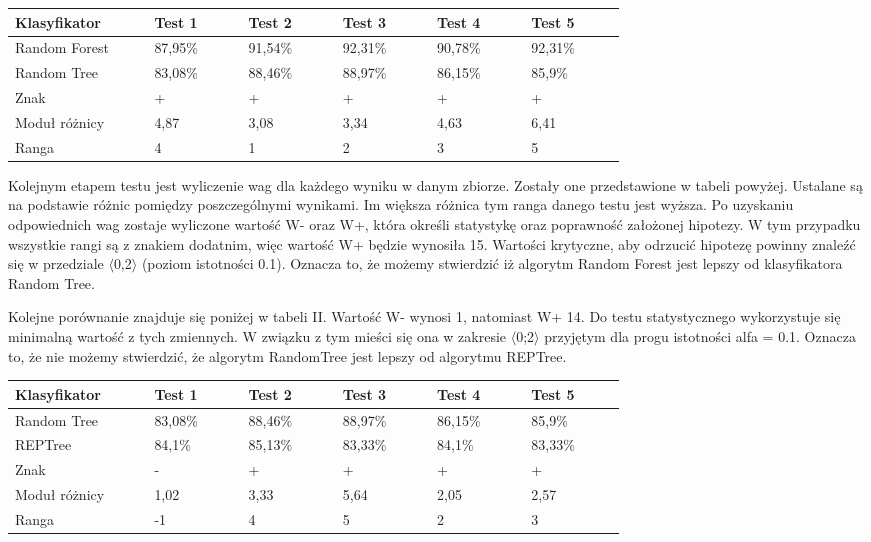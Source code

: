 \documentclass[conference]{IEEEtran}
\begin{document}
\begin{table}[H]

	\begin{tabular}{|p{0.16\linewidth}|p{0.11\linewidth}|p{0.11\linewidth}|p{0.11\linewidth}|p{0.11\linewidth}|p{0.11\linewidth}|}%
	\hline\centering
	Klasyfikator 	& Test 1 & Test 2 & Test 3 & Test 4 & Test 5 \\ \hline\centering
	Random Forest	& 87,95\% & 91,54\% & 92,31\% & 90,78\% & 92,31\% \\ \hline\centering
	Random Tree	& 83,08\% & 88,46\% & 88,97\% & 86,15\% & 85,9\% \\ \hline\centering
	Znak	& + & + & + & + & + \\ \hline\centering
	Moduł różnicy	& 4,87 & 3,08 & 3,34 & 4,63 & 6,41 \\ \hline\centering
	Ranga	& 4 & 1 & 2 & 3 & 5 \\ \hline
	\end{tabular}
\end{table}
Kolejnym etapem testu jest wyliczenie wag dla każdego wyniku w danym zbiorze. Zostały one przedstawione w tabeli powyżej. Ustalane są na podstawie różnic pomiędzy poszczególnymi wynikami. Im większa różnica tym ranga danego testu jest wyższa. Po uzyskaniu odpowiednich wag zostaje wyliczone wartość W- oraz W+, która określi statystykę oraz poprawność założonej hipotezy. W tym przypadku wszystkie rangi są z znakiem dodatnim, więc wartość W+ będzie wynosiła 15. Wartości krytyczne, aby odrzucić hipotezę powinny znaleźć się w przedziale $\langle$0,2$\rangle$ (poziom istotności 0.1). Oznacza to, że możemy stwierdzić iż algorytm Random Forest jest lepszy od klasyfikatora Random Tree. 

Kolejne porównanie znajduje się poniżej w tabeli II. Wartość W- wynosi 1, natomiast W+ 14. Do testu statystycznego wykorzystuje się minimalną wartość z tych zmiennych. W związku z tym mieści się ona w zakresie $\langle$0;2$\rangle$ przyjętym dla progu istotności alfa = 0.1. Oznacza to, że nie możemy stwierdzić, że algorytm RandomTree jest lepszy od algorytmu REPTree.  

\begin{table}[H]

	\begin{tabular}{|p{0.16\linewidth}|p{0.11\linewidth}|p{0.11\linewidth}|p{0.11\linewidth}|p{0.11\linewidth}|p{0.11\linewidth}|}%
	\hline\centering
	Klasyfikator 	& Test 1 & Test 2 & Test 3 & Test 4 & Test 5 \\ \hline\centering
	Random Tree	& 83,08\% & 88,46\% & 88,97\% & 86,15\% & 85,9\% \\ \hline\centering
	REPTree	& 84,1\% & 85,13\% & 83,33\% & 84,1\% & 83,33\% \\ \hline\centering
	Znak	& - & + & + & + & + \\ \hline\centering
	Moduł różnicy  & 1,02 & 3,33 & 5,64 & 2,05 & 2,57  \\ \hline\centering
	Ranga	& -1 & 4 & 5 & 2 & 3 \\ \hline
	\end{tabular}
\end{table} 
\end{document}
